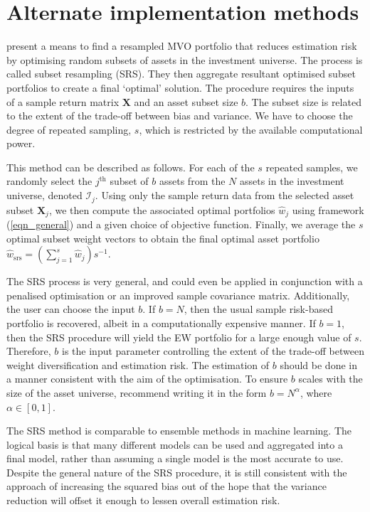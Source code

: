 \documentclass[a4paper,11pt,nocenter,bold,noupper,headcount]{mythesis}
\theoremstyle{plain}
\theoremstyle{definition}
\begin{document}
\section{Alternate implementation methods}

\cite{SW17} present a means to find a resampled MVO portfolio that reduces estimation risk by optimising random subsets of assets in the investment universe. The process is called subset resampling (SRS). They then aggregate resultant optimised subset portfolios to create a final `optimal' solution. The procedure requires the inputs of a sample return matrix $\textbf{X}$ and an asset subset size $b$. The subset size is related to the extent of the trade-off between bias and variance. We have to choose the degree of repeated sampling, $s$, which is restricted by the available computational power.

This method can be described as follows. For each of the $s$ repeated samples, we randomly select the $j^{\text{th}}$ subset of $b$ assets from the $N$ assets in the investment universe, denoted $\mathcal{I}_j$. Using only the sample return data from the selected asset subset $\textbf{X}_j$, we then compute the associated optimal portfolios $\hat{w}_j$ using framework (\ref{eqn_general}) and a given choice of objective function. Finally, we average the $s$ optimal subset weight vectors to obtain the final optimal asset portfolio $\hat{w}_\mathrm{srs} = (\sum_{j = 1}^s \hat{w}_j)s^{-1}$.

The SRS process is very general, and could even be applied in conjunction with a penalised optimisation or an improved sample covariance matrix. Additionally, the user can choose the input $b$. If $b = N$, then the usual sample risk-based portfolio is recovered, albeit in a computationally expensive manner. If $b = 1$, then the SRS procedure will yield the EW portfolio for a large enough value of $s$. Therefore, $b$ is the input parameter controlling the extent of the trade-off between weight diversification and estimation risk. The estimation of $b$ should be done in a manner consistent with the aim of the optimisation. To ensure $b$ scales with the size of the asset universe, \cite{SW17} recommend writing it in the form $b = N^{\alpha}$, where $\alpha \in [0, 1]$.

The SRS method is comparable to ensemble methods in machine learning. The logical basis is that many different models can be used and aggregated into a final model, rather than assuming a single model is the most accurate to use. Despite the general nature of the SRS procedure, it is still consistent with the approach of increasing the squared bias out of the hope that the variance reduction will offset it enough to lessen overall estimation risk.
\end{document}
